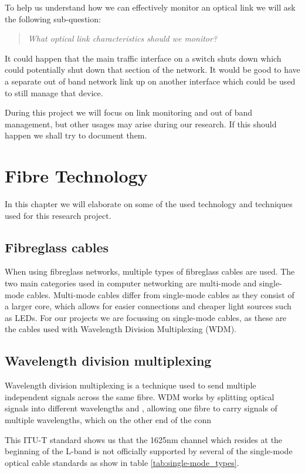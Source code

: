 \documentclass{article}
\begin{document}
To help us understand how we can effectively monitor an optical link we will ask the following sub-question:
\begin{quote}
\textit{
What optical link characteristics should we monitor?
}
\end{quote}

It could happen that the main traffic interface on a switch shuts down which could potentially shut down that section of the network.
It would be good to have a separate out of band network link up on another interface which could be used to still manage that device.

During this project we will focus on link monitoring and out of band management, but other usages may arise during our research.
If this should happen we shall try to document them.

\section{Fibre Technology}
In this chapter we will elaborate on some of the used technology and techniques used for this research project.
\subsection{Fibreglass cables}
When using fibreglass networks, multiple types of fibreglass cables are used.
The two main categories used in computer networking are multi-mode and single-mode cables.
Multi-mode cables differ from single-mode cables as they consist of a larger core, which allows for easier connections and cheaper light sources such as LEDs. \cite{Fundamentals:2008}
For our projects we are focussing on single-mode cables, as these are the cables used with Wavelength Division Multiplexing (WDM).

\subsection{Wavelength division multiplexing}
Wavelength division multiplexing is a technique used to send multiple independent signals across the same fibre.  WDM works by splitting optical signals into different wavelengths and , allowing one fibre to carry signals of multiple wavelengths, which on the other end of the conn

This ITU-T standard shows us that the 1625nm channel which resides at the beginning of the L-band is not officially supported by several of the single-mode optical cable standards as show in table \ref{tab:single-mode_types}.
\end{document}
